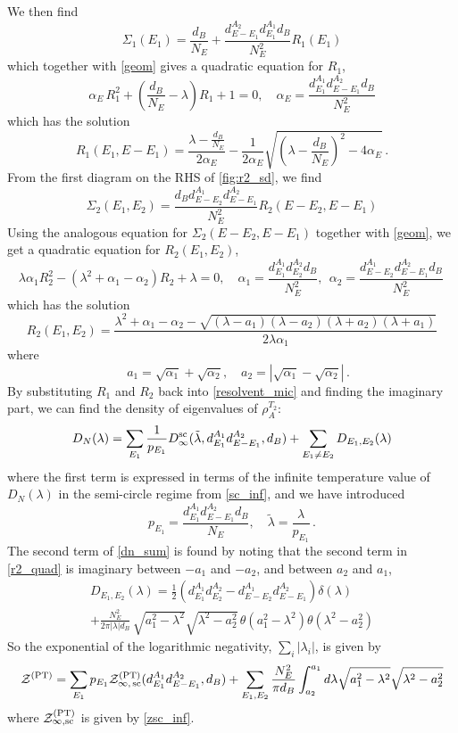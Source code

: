 \documentclass[a4paper,11pt]{article}
\newcommand{\be}{\begin{equation}}
\newcommand{\ee}{\end{equation}}
\newcommand\sZ{{\mathcal Z}}
\begin{document}
\begin{enumerate}
\begin{appendix}
We then find
\be 
\Sigma_1(E_1) = \frac{d_B}{N_E} + \frac{d^{A_2}_{E-E_1} d^{A_1}_{E_1} d_B}{N_E^2} R_1(E_1)
\ee
which together with \eqref{geom} gives a quadratic equation for $R_1$, 
\be 
 \alpha_E \, R_1^2 + \left(\frac{d_B}{N_E}-\lambda\right) R_1+ 1= 0 , \quad \alpha_E = \frac{d^{A_1}_{E_1} d^{A_2}_{E- E_1} d_B}{N_E^2} \label{r1_quad_E}
\ee
which has the solution 
\be 
R_1(E_1, E- E_1) = \frac{\lambda - \frac{d_B}{N_E}}{2\alpha_E} - \frac{1}{2\alpha_E} \sqrt{\left(\lambda - \frac{d_B}{N_E}\right)^2 - 4 \alpha_E} \, . 
\ee
From the first diagram on the RHS of \eqref{fig:r2_sd}, we find 
\be 
\Sigma_2(E_1, E_2) = \frac{d_B d^{A_1}_{E-E_2} d^{A_2}_{E-E_1}}{N_E^2} R_2(E-E_2, E-E_1)
\ee
Using the analogous equation for $\Sigma_2(E-E_2,E- E_1)$ together with \eqref{geom}, we get a quadratic equation for $R_2(E_1, E_2)$, 
\be 
 \lambda \alpha_1 R_2^2 -(\lambda^2 +\alpha_1 -\alpha_2) R_2 + \lambda = 0, \quad \alpha_1 = \frac{d^{A_1}_{E_1} d^{A_2}_{E_2} d_B}{N_E^2}, ~~ \alpha_2 = \frac{d^{A_1}_{E-E_2} d^{A_2}_{E-E_1} d_B}{ N_E^2} \, \label{a12}
\ee
which has the solution 
\be 
R_2(E_1, E_2) = \frac{\lambda^2 + \alpha_1 -\alpha_2 - \sqrt{(\lambda- a_1) (\lambda- a_2) (\lambda +a_2)(\lambda + a_1)}}{2 \lambda \alpha_1}
\label{r2_quad}
\ee
where 
\be 
\quad a_1 = \sqrt{\alpha_1}+ \sqrt{\alpha_2}, \quad a_2 = |\sqrt{\alpha_1}- \sqrt{\alpha_2}| \, . 
\ee
By substituting $R_1$ and $R_2$ back into \eqref{resolvent_mic} and finding the imaginary part, we can find the density of eigenvalues of $\rho_A^{T_2}$: 
\be 
D_N(\lambda) = \sum_{E_1}\frac{1}{p_{E_1}} D_{\infty}^{\rm sc}(\tilde{\lambda}, d^{A_1}_{E_1} d^{A_2}_{E-E_1}, d_B ) + \sum_{E_1\neq E_2} D_{E_1, E_2}(\lambda) 
\label{dn_sum}
\ee
where the first term is expressed in terms of the infinite temperature value of $D_N(\lambda)$ in the semi-circle regime from \eqref{sc_inf}, and we have introduced 
\be 
p_{E_1} = \frac{d^{A_1}_{E_1} d^{A_2}_{E-E_1} d_B}{N_E} , \quad \tilde{\lambda} = \frac{\lambda}{p_{E_1}} \, . 
\ee
The second term of \eqref{dn_sum} is found by noting that the second term in \eqref{r2_quad} is imaginary between $-a_1$ and $-a_2$, and between $a_2$ and $a_1$, 
\be
\begin{gathered} 
D_{E_1, E_2}(\lambda) = \frac{1}{2} (d^{A_1}_{E_1}d^{A_2}_{E_2} -d^{A_1}_{E- E_2}d^{A_2}_{E-E_1}) \delta(\lambda) \\ + \frac{N_E^2}{2\pi |\lambda| d_B}\, \sqrt{a_1^2 -\lambda^2} \sqrt{\lambda^2 - a_2^2} \, \theta(a_1^2 -\lambda^2) \theta(\lambda^2- a_2^2)
\end{gathered} 
\ee
So the exponential of the logarithmic negativity, $\sum_i |\lambda_i|$, is given by 
\be 
\sZ^{\rm(PT)}= \sum_{E_1} p_{E_1} \sZ^{\rm (PT)}_{\infty,\,{\rm sc}}(d^{A_1}_{E_1}d^{A_2}_{E-E_1}, d_B) + \sum_{E_1, E_2} \frac{N_E^2 }{\pi d_B} \int_{a_2}^{a_1} d\lambda \sqrt{a_1^2 -\lambda^2} \sqrt{\lambda^2 - a_2^2} 
\label{ln_two}
\ee
where $\sZ^{\rm (PT)}_{\infty,{\rm sc}}$ is given by \eqref{zsc_inf}. 


\end{appendix}
\end{enumerate}
\end{document}
